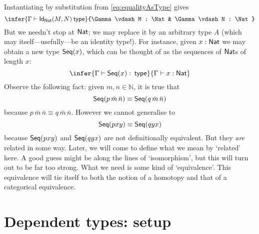 \documentclass[12pt]{article}
\begin{document}
Instantiating by substitution from \eqref{eq:equalityAsType} gives
\begin{equation*}
\infer{\Gamma \vdash \Id{\Nat}(M,N) \type}{\Gamma \vdash M : \Nat & \Gamma \vdash N : \Nat}
\end{equation*}
But we needn't stop at $\mathsf{Nat}$; we may replace it by an arbitrary type $A$ (which may itself---usefully---be an identity type!). For instance, given $x : \mathsf{Nat}$ we may obtain a new type $\mathsf{Seq}(x)$, which can be thought of as the sequences of $\mathsf{Nat}$s of length $x$:
\begin{equation*}
\infer{\Gamma \vdash \Seq(x) : \type}{\Gamma \vdash x : \Nat}
\end{equation*}
Observe the following fact: given $m,n \in \mathbb{N}$, it is true that
\begin{equation*}
\mathsf{Seq}(p\, \bar m\, \bar n) \equiv \mathsf{Seq}(q\, \bar m\, \bar n)
\end{equation*}
because $p\, \bar m\, \bar n \equiv q\, \bar m\, \bar n$. However we cannot generalise to
\begin{equation*}
\mathsf{Seq}(pxy) \equiv \mathsf{Seq}(qyx)
\end{equation*}
because $\mathsf{Seq}(pxy)$ and $\mathsf{Seq}(qyx)$ are not definitionally equivalent.
But they \emph{are} related in some way. Later, we will come to define what we mean by `related' here. A good guess might be along the lines of `isomorphism', but this will turn out to be far too strong. What we need is some kind of `equivalence'. This equivalence will tie itself to both the notion of a homotopy and that of a categorical equivalence.

\section{Dependent types: setup}
\end{document}
